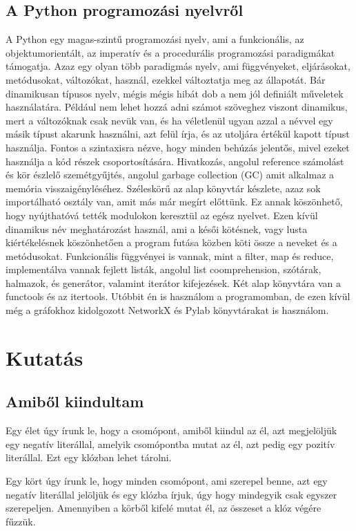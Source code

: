 \documentclass[
]{thesis-ekf}
\theoremstyle{definition}
\theoremstyle{remark}
\begin{document}
	\section{A Python programozási nyelvről}\label{python-programnyelv}
	A Python egy magas-szintű programozási nyelv, ami a funkcionális, az objektumorientált, az imperatív és a procedurális programozási paradigmákat támogatja. Azaz egy olyan több paradigmás nyelv, ami függvényeket, eljárásokat, metódusokat, változókat, használ, ezekkel változtatja meg az állapotát. Bár dinamikusan típusos nyelv, mégis mégis hibát dob a nem jól definiált műveletek használatára. Például nem lehet hozzá adni számot szöveghez viszont dinamikus, mert a változóknak csak nevük van, és ha véletlenül ugyan azzal a névvel egy másik típust akarunk használni, azt felül írja, és az utoljára értékül kapott típust használja. Fontos a szintaxisra nézve, hogy minden behúzás jelentős, mivel ezeket használja a kód részek csoportosítására. Hivatkozás, angolul reference számolást és kör észlelő szemétgyűjtés, angolul garbage collection (GC) amit alkalmaz a memória visszaigényléséhez. Széleskörű az alap könyvtár készlete, azaz sok importálható osztály van, amit más már megírt előttünk. Ez annak köszönhető, hogy nyújthatóvá tették modulokon keresztül az egész nyelvet. Ezen kívül dinamikus név meghatározást használ, ami a késői kötésnek, vagy lusta kiértékelésnek köszönhetően a program futása közben köti össze a neveket és a metódusokat. Funkcionális függvényei is vannak, mint a filter, map és reduce, implementálva vannak fejlett listák, angolul list coomprehension, szótárak, halmazok, és generátor, valamint iterátor kifejezések. Két alap könyvtára van a functools és az itertools. Utóbbit én is használom a programomban, de ezen kívül még a gráfokhoz kidolgozott NetworkX és Pylab könyvtárakat is használom.
	
	\chapter{Kutatás}
	\section{Amiből kiindultam}
	
	
	Egy élet úgy írunk le, hogy a csomópont, amiből kiindul az él, azt megjelöljük egy negatív literállal, amelyik csomópontba mutat az él, azt pedig egy pozitív literállal. Ezt egy klózban lehet tárolni.
	
	Egy kört úgy írunk le, hogy minden csomópont, ami szerepel benne, azt egy negatív literállal jelöljük és egy klózba írjuk, úgy hogy mindegyik csak egyszer szerepeljen. Amennyiben a körből kifelé mutat él, az összeset a klóz végére fűzzük.
	
\end{document}
